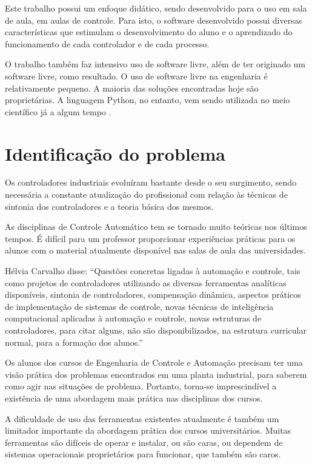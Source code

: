     Este trabalho possui um enfoque didático, sendo desenvolvido para o uso em sala de aula,
    em aulas de controle. Para isto, o software desenvolvido possui diversas características
    que estimulam o desenvolvimento do aluno e o aprendizado do funcionamento de cada controlador e 
    de cada processo.

    O trabalho também faz intensivo uso de software livre, além de ter originado um software
    livre, como resultado. O uso de software livre na engenharia é relativamente pequeno.
    A maioria das soluções encontradas hoje são proprietárias. A linguagem Python, no entanto,
    vem sendo utilizada no meio científico já a algum tempo \cite{5725235}.


\section{Identificação do problema}
    
    Os controladores industriais evoluíram bastante desde o seu surgimento, sendo necessária
    a constante atualização do profissional com relação às técnicas de sintonia dos
    controladores e a teoria básica dos mesmos.

    As disciplinas de Controle Automático tem se tornado muito teóricas nos últimos
    tempos. É difícil para um professor proporcionar experiências práticas para os
    alunos com o material atualmente disponível nas salas de aula das universidades.
    
    Hélvia Carvalho disse: ``Questões concretas ligadas à automação e controle, tais como projetos de
    controladores utilizando as diversas ferramentas analíticas disponíveis, sintonia de
    controladores, compensação dinâmica, aspectos práticos de implementação de sistemas de
    controle, novas técnicas de inteligência computacional aplicadas à automação e controle,
    novas estruturas de controladores, para citar alguns, não são disponibilizados, na estrutura
    curricular normal, para a formação dos alunos.'' \cite{cobenge}

    Os alunos dos cursos de Engenharia de Controle e Automação precisam ter uma
    visão prática dos problemas encontrados em uma planta industrial, para saberem
    como agir nas situações de problema. Portanto, torna-se imprescindível a existência
    de uma abordagem mais prática nas disciplinas dos cursos.

    A dificuldade de uso das ferramentas existentes atualmente é também um limitador
    importante da abordagem prática dos cursos universitários. Muitas ferramentas
    são difíceis de operar e instalar, ou são caras, ou dependem de sistemas operacionais
    proprietários para funcionar, que também são caros.

